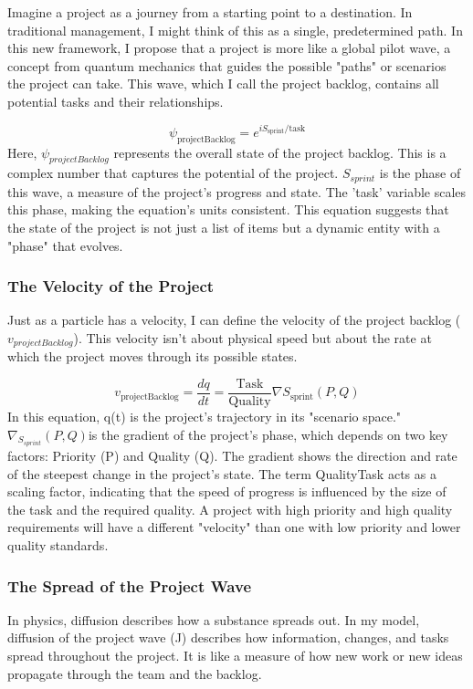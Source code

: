 \documentclass{article}
\begin{document}
Imagine a project as a journey from a starting point to a destination. In traditional management, I might think of this as a single, predetermined path. In this new framework, I propose that a project is more like a global pilot wave, a concept from quantum mechanics that guides the possible "paths" or scenarios the project can take. This wave, which I call the project backlog, contains all potential tasks and their relationships.

\begin{equation}
\psi_{\text{projectBacklog}} = e^{iS_{\text{sprint}}/\text{task}}
\end{equation}
Here, $\psi_{projectBacklog}$ represents the overall state of the project backlog. This is a complex number that captures the potential of the project. $S_{sprint}$ is the phase of this wave, a measure of the project's progress and state. The 'task' variable scales this phase, making the equation's units consistent. This equation suggests that the state of the project is not just a list of items but a dynamic entity with a "phase" that evolves.

\subsubsection*{The Velocity of the Project}
Just as a particle has a velocity, I can define the velocity of the project backlog ($v_{projectBacklog}$). This velocity isn't about physical speed but about the rate at which the project moves through its possible states.

\begin{equation}
v_{\text{projectBacklog}} = \frac{dq}{dt} = \frac{\text{Task}}{\text{Quality}} \nabla S_{\text{sprint}}(P, Q)
\end{equation}
In this equation, q(t) is the project's trajectory in its "scenario space." $\nabla_{S_{sprint}}(P,Q)$is the gradient of the project's phase, which depends on two key factors: Priority (P) and Quality (Q). The gradient shows the direction and rate of the steepest change in the project's state. The term QualityTask acts as a scaling factor, indicating that the speed of progress is influenced by the size of the task and the required quality. A project with high priority and high quality requirements will have a different "velocity" than one with low priority and lower quality standards.

\subsubsection*{The Spread of the Project Wave}
In physics, diffusion describes how a substance spreads out. In my model, diffusion of the project wave (J) describes how information, changes, and tasks spread throughout the project. It is like a measure of how new work or new ideas propagate through the team and the backlog.
\end{document}
